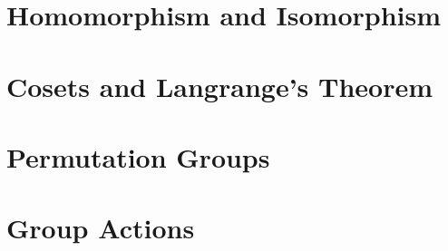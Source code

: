 \documentclass[12pt,a4paper]{article}
\begin{document}
  \section{Homomorphism and Isomorphism}
  \section{Cosets and Langrange's Theorem}
  \section{Permutation Groups}
  \section{Group Actions}
\end{document}
